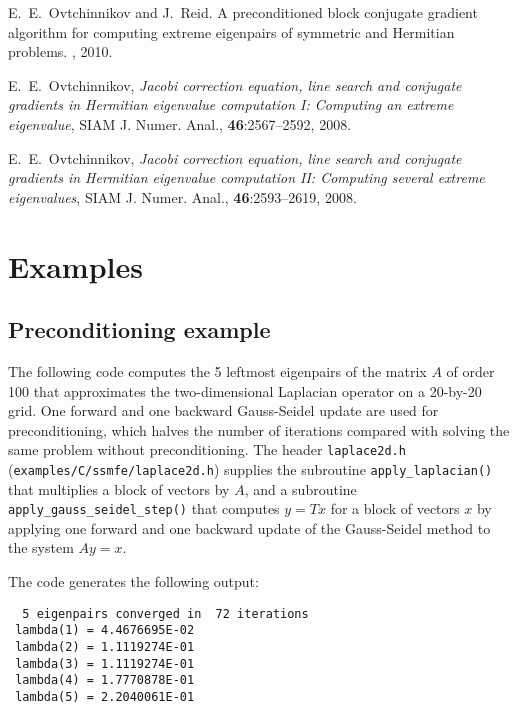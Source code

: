 
E.~E.~Ovtchinnikov and J.~Reid.
A preconditioned block conjugate gradient
algorithm for computing extreme eigenpairs
of symmetric and Hermitian problems.
\report, 2010.

E.~E.~Ovtchinnikov,
{\em Jacobi correction equation, line search and
conjugate gradients in Hermitian eigenvalue computation I:
Computing an extreme eigenvalue},
SIAM J. Numer. Anal., {\bf 46}:2567--2592, 2008.

E.~E.~Ovtchinnikov,
{\em Jacobi correction equation, line search and
conjugate gradients in Hermitian eigenvalue computation II:
Computing several extreme eigenvalues},
SIAM J. Numer. Anal., {\bf 46}:2593--2619, 2008.

\section{Examples}

\subsection{Preconditioning example}
\label{sec:ex.prec}

The following code 
computes the 5 leftmost eigenpairs of 
the matrix $A$ of order 100 that approximates 
the two-dimensional Laplacian operator
on a 20-by-20 grid.
One forward and one backward Gauss-Seidel update
are used for preconditioning,
which halves the number of iterations
compared with solving the same problem without preconditioning.
The header {\tt laplace2d.h} (\texttt{examples/C/ssmfe/laplace2d.h})
supplies the subroutine {\tt apply\_laplacian()}
that multiplies a block of vectors by $A$,
and a subroutine 
{\tt apply\_gauss\_seidel\_step()}
that computes $y = T x$ for a block of vectors $x$
by applying one forward and one backward update
of the Gauss-Seidel method to the system $A y = x$.

The code generates the following output:
\begin{verbatim}
  5 eigenpairs converged in  72 iterations
 lambda(1) = 4.4676695E-02
 lambda(2) = 1.1119274E-01
 lambda(3) = 1.1119274E-01
 lambda(4) = 1.7770878E-01
 lambda(5) = 2.2040061E-01
\end{verbatim}
